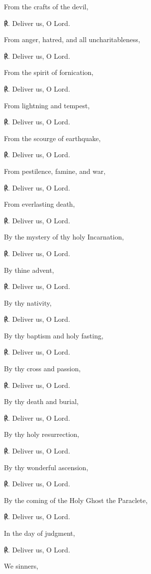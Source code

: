 \begin{multicols}{2}
From the crafts of the devil,\par
℟. Deliver us, O Lord.\par\noindent
From anger, hatred, and all uncharitableness,\par
℟. Deliver us, O Lord.\par\noindent
From the spirit of fornication,\par
℟. Deliver us, O Lord.\par\noindent
From lightning and tempest,\par
℟. Deliver us, O Lord.\par\noindent
From the scourge of earthquake,\par
℟. Deliver us, O Lord.\par\noindent
From pestilence, famine, and war,\par
℟. Deliver us, O Lord.\par\noindent
From everlasting death,\par
℟. Deliver us, O Lord.\par\noindent
By the mystery of thy holy Incarnation,\par
℟. Deliver us, O Lord.\par\noindent
By thine advent,\par
℟. Deliver us, O Lord.\par\noindent
By thy nativity,\par
℟. Deliver us, O Lord.\par\noindent
By thy baptism and holy fasting,\par
℟. Deliver us, O Lord.\par\noindent
By thy cross and passion,\par
℟. Deliver us, O Lord.\par\noindent
By thy death and burial,\par
℟. Deliver us, O Lord.\par\noindent
By thy holy resurrection,\par
℟. Deliver us, O Lord.\par\noindent
By thy wonderful ascension,\par
℟. Deliver us, O Lord.\par\noindent
By the coming of the Holy Ghost the Paraclete,\par
℟. Deliver us, O Lord.\par\noindent
In the day of judgment,\par
℟. Deliver us, O Lord.\par\noindent
We sinners,\par

\end{multicols}
